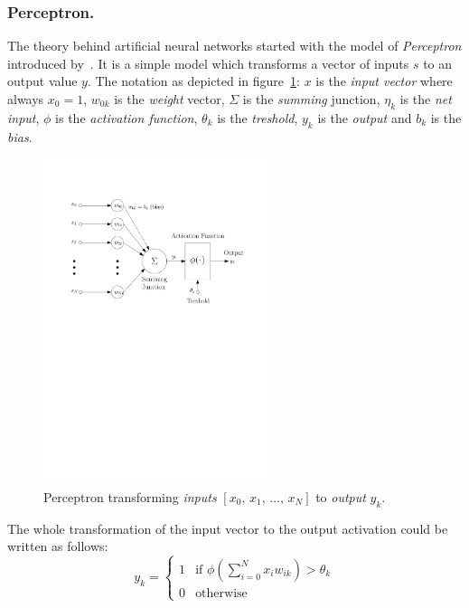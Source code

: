 \subsubsection{Perceptron.}
\label{sec:models-perceptron}

The theory behind artificial neural networks started with the model of \emph{Perceptron} introduced by~\citet{mcculloch1943logical}. It is a simple model which transforms a vector of inputs $s$ to an output value $y$. The notation as depicted in figure~\ref{fig:perceptron}: $x$ is the \emph{input vector} where always $x_0=1$, $w_{0k}$ is the \emph{weight} vector, $\Sigma$ is the \emph{summing} junction, $\eta_k$ is the \emph{net input}, $\phi$ is the \emph{activation function}, $\theta_k$ is the \emph{treshold}, $y_k$ is the \emph{output} and $b_k$ is the \emph{bias}.

\begin{figure}[H]
  \centering
  \includegraphics[width=0.6\textwidth]{img/perceptron.pdf}    
  \caption{Perceptron transforming \emph{inputs} $[x_0,\, x_1,\, \ldots,\, x_N]$ to \emph{output} $y_k$.} 
  \label{fig:perceptron}
\end{figure}

The whole transformation of the input vector to the output activation could be written as follows: 
\begin{equation}
\label{eq:perceptron} 
y_k =
\left\{
	\begin{array}{ll}
		1 & \mbox{if } \phi(\sum_{i=0}^N x_iw_{ik}) > \theta_k \\
		0 & \mbox{otherwise}
	\end{array}
\right.
\end{equation} 

